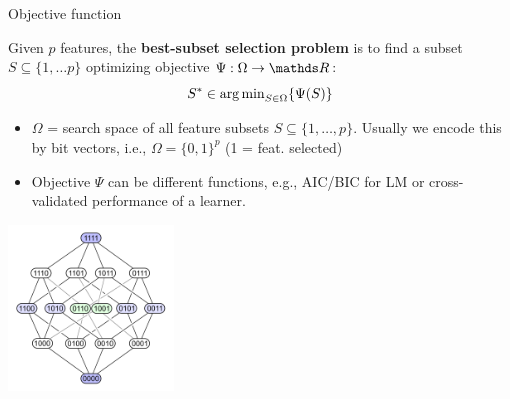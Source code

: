 \documentclass[11pt,compress,t,notes=noshow, xcolor=table]{beamer}
\begin{document}
  \begin{vbframe}{Objective function}


    Given $p$ features, the \textbf{best-subset selection problem} is to find a subset $S \subseteq \{ 1, \dots p \}$ optimizing objective $\Psi: \Omega \rightarrow \R$:
    \vspace{-0.1cm}
    $$S^{*}  \in \operatorname{arg\,min}_{{S \in \Omega}} \{ \Psi(S) \}$$
    \vspace{-0.8cm}
    \begin{itemize}
    \setlength{\itemsep}{0.9em}
     \item $\Omega$  = search space of all feature subsets $S\subseteq\{ 1, \dots, p \}$. Usually we encode this by
      bit vectors, i.e., $\Omega = \{0, 1\}^p$ (1 = feat. selected)
     \item Objective $\Psi$ can be different functions, e.g., AIC/BIC for LM or cross-validated performance of a learner.
    \end{itemize}

    \begin{center}
     \includegraphics[width = 0.33\textwidth]{slides/feature-selection/figure_man/searchspace_binary.png}\\
    \end{center}
  \end{vbframe} 
\end{document}
